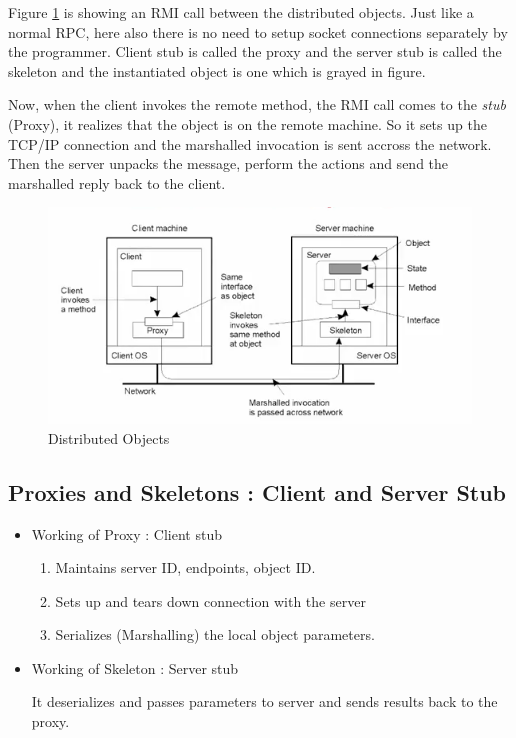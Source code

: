\documentclass[twoside]{article}
\begin{document}
Figure \ref{distributed_obj} is showing an RMI call between the distributed objects. Just like a normal RPC, here also there is no need to setup socket connections separately by the programmer. Client stub is called the proxy and the server stub is called the skeleton and the instantiated object is one which is grayed in figure.

Now, when the client invokes the remote method, the RMI call comes to the \textit{stub} (Proxy), it realizes that the object is on the remote machine. So it sets up the TCP/IP connection and the marshalled invocation is sent accross the network. Then the server unpacks the message, perform the actions and send the marshalled reply back to the client.

\begin{figure}[h]
\begin{center}
\includegraphics[scale=0.7]{images/RMI}
\caption{Distributed Objects}
\label{distributed_obj}
\end{center}
\end{figure}

\subsection{Proxies and Skeletons : Client and Server Stub}

\begin{itemize}

\item Working of Proxy : Client stub

\begin{enumerate}
	\item Maintains server ID, endpoints, object ID.
	\item Sets up and tears down connection with the server
	\item Serializes (Marshalling) the local object parameters.
\end{enumerate}

\item Working of Skeleton : Server stub

It deserializes and passes parameters to server and sends results back to the proxy.

\end{itemize}
\end{document}
